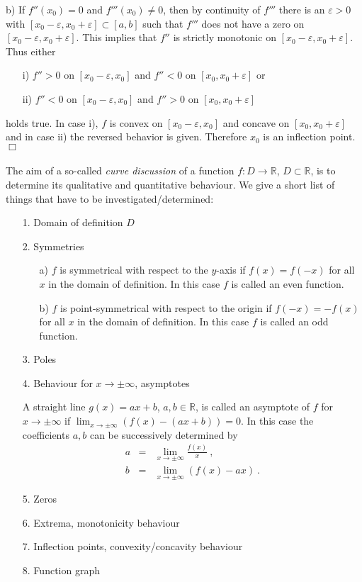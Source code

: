 b) If $f''(x_0)=0$ and $f'''(x_0)\neq 0$, then by continuity of $f'''$ there is an $\varepsilon>0$ with 
   $[x_0-\varepsilon,x_0+\varepsilon]\subset[a,b]$ such that $f'''$ does not have a zero on $[x_0-\varepsilon,x_0+\varepsilon]$.
   This implies that $f''$ is strictly monotonic on $[x_0-\varepsilon,x_0+\varepsilon]$. Thus either
   \begin{enumerate}
    \item[i)] $f''>0$ on $[x_0-\varepsilon,x_0]$ and  $f''< 0$ on $[x_0,x_0+\varepsilon]$ or
    \item[ii)] $f''< 0$ on $[x_0-\varepsilon,x_0]$ and  $f''> 0$ on $[x_0,x_0+\varepsilon]$
   \end{enumerate}
   holds true.
   In case i), $f$ is convex on $[x_0-\varepsilon,x_0]$ and concave on $[x_0,x_0+\varepsilon]$ and 
   in case ii) the reversed behavior is given.
   Therefore $x_0$ is an inflection point.
\hfill$\Box$
 \\ \\
The aim of a so-called \emph{curve discussion} of a function $f:D\rightarrow \mathbb{R}$, $D\subset \mathbb{R}$, is to determine its qualitative and 
quantitative behaviour. We give a short list of things that have to be investigated/determined:

\begin{enumerate}
 \item[1.] Domain of definition $D$
 \item[2.] Symmetries
    \begin{enumerate}
    \item[a)] $f$ is symmetrical with respect to the $y$-axis if $f(x)=f(-x)$ for all $x$ in the domain of definition.
              In this case $f$ is called an even function.
    \item[b)] $f$ is point-symmetrical with respect to the origin if $f(-x)=-f(x)$ for all  $x$ in the domain of definition.
              In this case $f$ is called an odd function.
    \end{enumerate}
  \item[3.] Poles
  \item[4.] Behaviour for $x\longrightarrow \pm\infty$, asymptotes
      
      A straight line $g(x)=ax+b$, $a,b\in\mathbb{R}$, is called an asymptote of $f$ for $x\rightarrow\pm\infty$ 
            if $\lim_{x\rightarrow\pm\infty}(f(x)-(ax+b)) = 0$. In this case the coefficients $a,b$ can be 
            successively determined by
	    \begin{eqnarray*}
	     a &=& \lim_{x\rightarrow\pm\infty}\frac{f(x)}{x}\ , \\
	     b &=& \lim_{x\rightarrow\pm\infty}(f(x)-ax) \ .
	    \end{eqnarray*}
  \item[5.] Zeros
  \item[6.] Extrema, monotonicity behaviour
  \item[7.] Inflection points, convexity/concavity behaviour
  \item[8.] Function graph
\end{enumerate}
 
